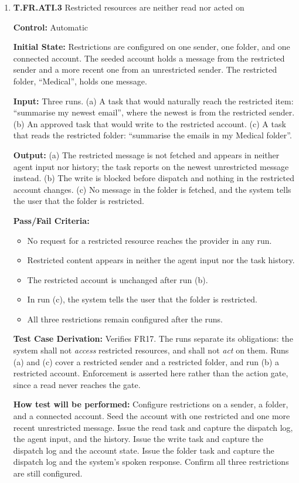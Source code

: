 \documentclass[12pt, titlepage]{article}
\begin{document}
\begin{enumerate}
\item{\textbf{T.FR.ATI.3} Restricted resources are neither read nor acted on\\}\label{test:T.FR.ATI.3}

\textbf{Control:} Automatic

\textbf{Initial State:} Restrictions are configured on one sender, one folder, and one connected account. The
seeded account holds a message from the restricted sender and a more recent one from an unrestricted sender.
The restricted folder, ``Medical'', holds one message.

\textbf{Input:} Three runs. (a) A task that would naturally reach the restricted item: ``summarise my newest
email'', where the newest is from the restricted sender. (b) An approved task that would write to the restricted
account. (c) A task that reads the restricted folder: ``summarise the emails in my Medical folder''.

\textbf{Output:} (a) The restricted message is not fetched and appears in neither agent input nor history; the
task reports on the newest unrestricted message instead. (b) The write is blocked before dispatch and nothing in
the restricted account changes. (c) No message in the folder is fetched, and the system tells the user that the folder is restricted.

\textbf{Pass/Fail Criteria:}
\begin{itemize}
  \item No request for a restricted resource reaches the provider in any run.
  \item Restricted content appears in neither the agent input nor the task history.
  \item The restricted account is unchanged after run (b).
  \item In run (c), the system tells the user that the folder is restricted.
  \item All three restrictions remain configured after the runs.
\end{itemize}

\textbf{Test Case Derivation:} Verifies FR17. The runs separate its obligations: the system shall not \emph{access} restricted resources, and shall not
\emph{act} on them. Runs (a) and (c) cover a restricted sender and a restricted folder, and run (b) a restricted account. Enforcement is asserted here rather than the action gate, since a read never reaches the gate.

\textbf{How test will be performed:} Configure restrictions on a sender, a folder, and a connected account. Seed the account with one restricted and one more recent unrestricted message.
Issue the read task and capture the dispatch log, the agent input, and the history. Issue the write task and capture the dispatch log and the account state. Issue the folder task and capture the dispatch log and the system's spoken response.
Confirm all three restrictions are still configured.
\end{enumerate}
\end{document}
